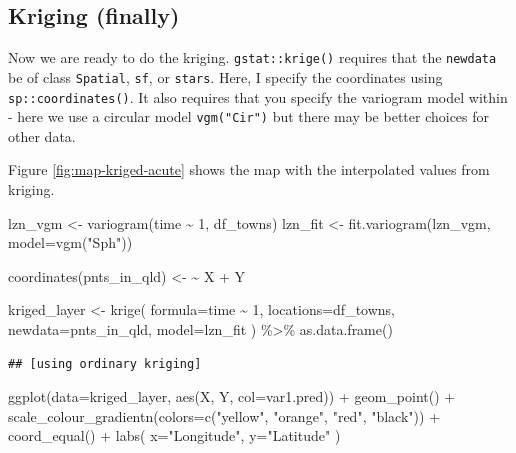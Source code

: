 \documentclass[
]{book}
\newenvironment{Shaded}{\begin{snugshade}}{\end{snugshade}}
\newcommand{\AttributeTok}[1]{\textcolor[rgb]{0.77,0.63,0.00}{#1}}
\newcommand{\DecValTok}[1]{\textcolor[rgb]{0.00,0.00,0.81}{#1}}
\newcommand{\ErrorTok}[1]{\textcolor[rgb]{0.64,0.00,0.00}{\textbf{#1}}}
\newcommand{\FunctionTok}[1]{\textcolor[rgb]{0.00,0.00,0.00}{#1}}
\newcommand{\NormalTok}[1]{#1}
\newcommand{\OtherTok}[1]{\textcolor[rgb]{0.56,0.35,0.01}{#1}}
\newcommand{\SpecialCharTok}[1]{\textcolor[rgb]{0.00,0.00,0.00}{#1}}
\newcommand{\StringTok}[1]{\textcolor[rgb]{0.31,0.60,0.02}{#1}}
\begin{document}
\hypertarget{kriging-finally}{%
\subsection{Kriging (finally)}\label{kriging-finally}}

Now we are ready to do the kriging. \texttt{gstat::krige()} requires that the \texttt{newdata} be of class \texttt{Spatial}, \texttt{sf}, or \texttt{stars}. Here, I specify the coordinates using \texttt{sp::coordinates()}. It also requires that you specify the variogram model within - here we use a circular model \texttt{vgm("Cir")} but there may be better choices for other data.

Figure \ref{fig:map-kriged-acute} shows the map with the interpolated values from kriging.

\begin{Shaded}
\begin{Highlighting}[]
\NormalTok{lzn\_vgm }\OtherTok{\textless{}{-}} \FunctionTok{variogram}\NormalTok{(time }\SpecialCharTok{\textasciitilde{}} \DecValTok{1}\NormalTok{, df\_towns)}
\NormalTok{lzn\_fit }\OtherTok{\textless{}{-}} \FunctionTok{fit.variogram}\NormalTok{(lzn\_vgm, }\AttributeTok{model=}\FunctionTok{vgm}\NormalTok{(}\StringTok{"Sph"}\NormalTok{))}

\FunctionTok{coordinates}\NormalTok{(pnts\_in\_qld) }\OtherTok{\textless{}{-}} \ErrorTok{\textasciitilde{}}\NormalTok{ X }\SpecialCharTok{+}\NormalTok{ Y}

\NormalTok{kriged\_layer }\OtherTok{\textless{}{-}}
  \FunctionTok{krige}\NormalTok{(}
    \AttributeTok{formula=}\NormalTok{time }\SpecialCharTok{\textasciitilde{}} \DecValTok{1}\NormalTok{, }
    \AttributeTok{locations=}\NormalTok{df\_towns,}
    \AttributeTok{newdata=}\NormalTok{pnts\_in\_qld,}
    \AttributeTok{model=}\NormalTok{lzn\_fit}
\NormalTok{  ) }\SpecialCharTok{\%\textgreater{}\%}
  \FunctionTok{as.data.frame}\NormalTok{()}
\end{Highlighting}
\end{Shaded}

\begin{verbatim}
## [using ordinary kriging]
\end{verbatim}

\begin{Shaded}
\begin{Highlighting}[]
\FunctionTok{ggplot}\NormalTok{(}\AttributeTok{data=}\NormalTok{kriged\_layer, }\FunctionTok{aes}\NormalTok{(X, Y, }\AttributeTok{col=}\NormalTok{var1.pred)) }\SpecialCharTok{+} 
  \FunctionTok{geom\_point}\NormalTok{() }\SpecialCharTok{+}
  \FunctionTok{scale\_colour\_gradientn}\NormalTok{(}\AttributeTok{colors=}\FunctionTok{c}\NormalTok{(}\StringTok{"yellow"}\NormalTok{, }\StringTok{"orange"}\NormalTok{, }\StringTok{"red"}\NormalTok{, }\StringTok{"black"}\NormalTok{)) }\SpecialCharTok{+}
  \FunctionTok{coord\_equal}\NormalTok{() }\SpecialCharTok{+}
  \FunctionTok{labs}\NormalTok{(}
    \AttributeTok{x=}\StringTok{"Longitude"}\NormalTok{,}
    \AttributeTok{y=}\StringTok{"Latitude"}
\NormalTok{  )}
\end{Highlighting}
\end{Shaded}
\end{document}

